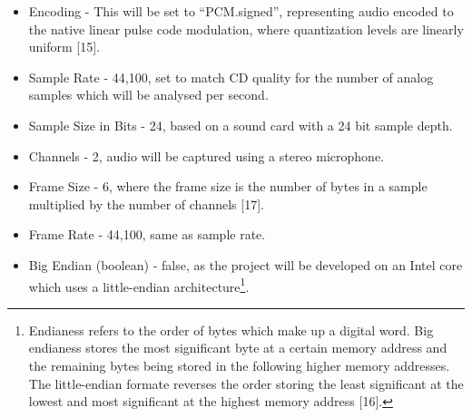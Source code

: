 \documentclass[a4paper, 11pt]{article}
\begin{document}
\begin{itemize}
\item Encoding - This will be set to ``PCM.signed'', representing audio encoded to the native linear pulse code modulation, where quantization levels are linearly uniform [15].
\item Sample Rate - 44,100, set to match CD quality for the number of analog samples which will be analysed per second. 
\item Sample Size in Bits - 24, based on a sound card with a 24 bit sample depth.
\item Channels - 2, audio will be captured using a stereo microphone.
\item Frame Size - 6, where the frame size is the number of bytes in a sample multiplied by the number of channels [17].
\item Frame Rate - 44,100, same as sample rate.
\item Big Endian (boolean) - false, as the project will be developed on an Intel core which uses a little-endian architecture\footnote{Endianess refers to the order of bytes which make up a digital word. Big endianess stores the most significant byte at a certain memory address and the remaining bytes being stored in the following higher memory addresses. The little-endian formate reverses the order storing the least significant at the lowest and most significant at the highest memory address [16].}.
\end{itemize}
\end{document}
